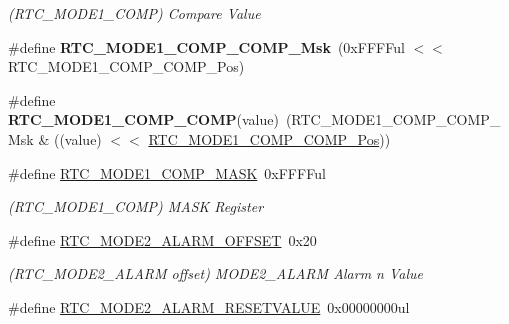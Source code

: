 \begin{DoxyCompactItemize}
\begin{DoxyCompactList}\small\item\em (R\+T\+C\+\_\+\+M\+O\+D\+E1\+\_\+\+C\+O\+M\+P) Compare Value \end{DoxyCompactList}\item 
\hypertarget{group___s_a_m_l21___r_t_c_gaca55c4a21990250bd7ab00bb84e30db2}{}\#define {\bfseries R\+T\+C\+\_\+\+M\+O\+D\+E1\+\_\+\+C\+O\+M\+P\+\_\+\+C\+O\+M\+P\+\_\+\+Msk}~(0x\+F\+F\+F\+Ful $<$$<$ R\+T\+C\+\_\+\+M\+O\+D\+E1\+\_\+\+C\+O\+M\+P\+\_\+\+C\+O\+M\+P\+\_\+\+Pos)\label{group___s_a_m_l21___r_t_c_gaca55c4a21990250bd7ab00bb84e30db2}

\item 
\hypertarget{group___s_a_m_l21___r_t_c_ga87b00771ea3f6e4431cef4f2f6c19177}{}\#define {\bfseries R\+T\+C\+\_\+\+M\+O\+D\+E1\+\_\+\+C\+O\+M\+P\+\_\+\+C\+O\+M\+P}(value)~(R\+T\+C\+\_\+\+M\+O\+D\+E1\+\_\+\+C\+O\+M\+P\+\_\+\+C\+O\+M\+P\+\_\+\+Msk \& ((value) $<$$<$ \hyperlink{group___s_a_m_l21___r_t_c_ga57893682ea302a030c54e3671a905892}{R\+T\+C\+\_\+\+M\+O\+D\+E1\+\_\+\+C\+O\+M\+P\+\_\+\+C\+O\+M\+P\+\_\+\+Pos}))\label{group___s_a_m_l21___r_t_c_ga87b00771ea3f6e4431cef4f2f6c19177}

\item 
\hypertarget{group___s_a_m_l21___r_t_c_gad00e1b5dd3a0c314dca226dc3ae93def}{}\#define \hyperlink{group___s_a_m_l21___r_t_c_gad00e1b5dd3a0c314dca226dc3ae93def}{R\+T\+C\+\_\+\+M\+O\+D\+E1\+\_\+\+C\+O\+M\+P\+\_\+\+M\+A\+S\+K}~0x\+F\+F\+F\+Ful\label{group___s_a_m_l21___r_t_c_gad00e1b5dd3a0c314dca226dc3ae93def}

\begin{DoxyCompactList}\small\item\em (R\+T\+C\+\_\+\+M\+O\+D\+E1\+\_\+\+C\+O\+M\+P) M\+A\+S\+K Register \end{DoxyCompactList}\item 
\hypertarget{group___s_a_m_l21___r_t_c_ga8927e920ae262b5ee136ec8a4a18c172}{}\#define \hyperlink{group___s_a_m_l21___r_t_c_ga8927e920ae262b5ee136ec8a4a18c172}{R\+T\+C\+\_\+\+M\+O\+D\+E2\+\_\+\+A\+L\+A\+R\+M\+\_\+\+O\+F\+F\+S\+E\+T}~0x20\label{group___s_a_m_l21___r_t_c_ga8927e920ae262b5ee136ec8a4a18c172}

\begin{DoxyCompactList}\small\item\em (R\+T\+C\+\_\+\+M\+O\+D\+E2\+\_\+\+A\+L\+A\+R\+M offset) M\+O\+D\+E2\+\_\+\+A\+L\+A\+R\+M Alarm n Value \end{DoxyCompactList}\item 
\hypertarget{group___s_a_m_l21___r_t_c_ga7a26dc6f9693ba3d2821fb9d2d061178}{}\#define \hyperlink{group___s_a_m_l21___r_t_c_ga7a26dc6f9693ba3d2821fb9d2d061178}{R\+T\+C\+\_\+\+M\+O\+D\+E2\+\_\+\+A\+L\+A\+R\+M\+\_\+\+R\+E\+S\+E\+T\+V\+A\+L\+U\+E}~0x00000000ul\label{group___s_a_m_l21___r_t_c_ga7a26dc6f9693ba3d2821fb9d2d061178}


\end{DoxyCompactItemize}
